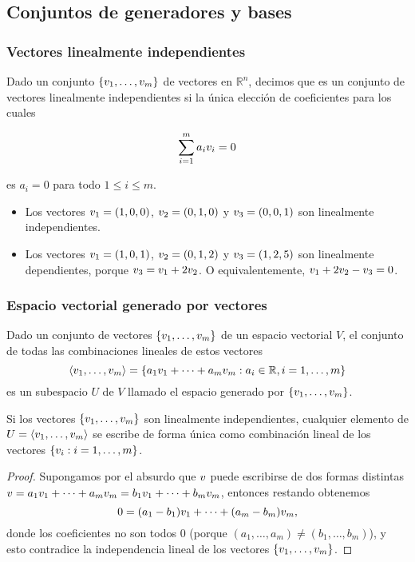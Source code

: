 \subsection{Conjuntos de generadores y bases}

\subsubsection{Vectores linealmente independientes}

Dado un conjunto $\{\vb_1, \dots, \vb_m\}$ de vectores en $\mathbb{R}^n$, decimos que es un conjunto de vectores linealmente independientes si la única elección de coeficientes para los cuales

$$\sum_{i=1}^m a_i \vb_i = 0$$

es $a_i = 0$ para todo $1 \le i \le m$.

\begin{ejemplo}\leavevmode
\begin{itemize}
\item Los vectores $\vb_1 = (1,0,0)$, $\vb_2 = (0, 1, 0)$ y $\vb_3 = (0, 0, 1)$ son linealmente independientes.
\item Los vectores $\vb_1 = (1,0,1)$, $\vb_2 = (0, 1, 2)$ y $\vb_3 = (1, 2, 5)$ son linealmente dependientes, porque $\vb_3 = \vb_1 + 2\vb_2$. O equivalentemente, $\vb_1 + 2\vb_2 - \vb_3 = 0$.
\end{itemize}
\end{ejemplo}

\subsubsection{Espacio vectorial generado por vectores}
Dado un conjunto de vectores $\{\vb_1, \dots, \vb_m\}$ de un espacio vectorial $V$, el conjunto de todas las combinaciones lineales de estos vectores
$$
\langle \vb_1, \dots, \vb_m \rangle = \{a_1 \vb_1 + \dots + a_m \vb_m : a_i \in \mathbb{R}, i = 1, \dots, m\}
$$
es un subespacio $U$ de $V$ llamado el espacio generado por $\{\vb_1, \dots, \vb_m\}$.

\begin{prop}
Si los vectores $\{\vb_1, \dots, \vb_m\}$ son linealmente independientes, cualquier elemento de $U = \langle \vb_1, \dots, \vb_m \rangle$ se escribe de forma única como combinación lineal de los vectores $\{\vb_i: i = 1, \dots, m\}$.
\end{prop}

\begin{proof}
Supongamos por el absurdo que $\vb$ puede escribirse de dos formas distintas $\vb = a_1 \vb_1 + \dots + a_m \vb_m = b_1 \vb_1 + \dots + b_m \vb_m$, entonces restando obtenemos
$$
0 = (a_1-b_1) \vb_1 + \dots + (a_m-b_m) \vb_m,
$$
donde los coeficientes no son todos 0 (porque $(a_1, \dots, a_m) \neq (b_1, \dots, b_m)$), y esto contradice la independencia lineal de los vectores $\{\vb_1, \dots, \vb_m\}$.
\end{proof}


